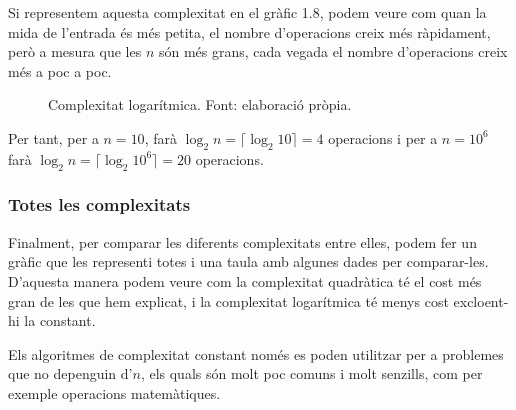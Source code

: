 Si representem aquesta complexitat en el gràfic 1.8, podem veure com quan la mida de l'entrada és més petita, el nombre d'operacions creix més ràpidament, però a mesura que les $n$ són més grans, cada vegada el nombre d'operacions creix més a poc a poc.
\begin{figure}[H]
    \centering
{}
    \caption[Complexitat logarítmica.]{Complexitat logarítmica. Font: elaboració pròpia.}
    \label{fig:my_label}
\end{figure}

Per tant, per a $n = 10$, farà $\log_2{n} = \lceil\log_2{10}\rceil = 4$ operacions i per a $n = 10^6$ farà $\log_2{n} = \lceil\log_2{10^6}\rceil = 20$ operacions.

\subsubsection*{Totes les complexitats}
Finalment, per comparar les diferents complexitats entre elles, podem fer un gràfic que les representi totes i una taula amb algunes dades per comparar-les. D'aquesta manera podem veure com la complexitat quadràtica té el cost més gran de les que hem explicat, i la complexitat logarítmica té menys cost excloent-hi la constant.

Els algoritmes de complexitat constant només es poden utilitzar per a problemes que no depenguin d'$n$, els quals són molt poc comuns i molt senzills, com per exemple operacions matemàtiques.

